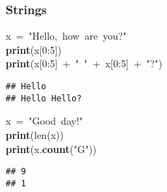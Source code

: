 \documentclass{beamer}\usepackage[]{graphicx}\usepackage[]{color}
\makeatletter
\newcommand{\hlnum}[1]{\textcolor[rgb]{0.686,0.059,0.569}{#1}}%
\newcommand{\hlstr}[1]{\textcolor[rgb]{0.192,0.494,0.8}{#1}}%
\newcommand{\hlopt}[1]{\textcolor[rgb]{0,0,0}{#1}}%
\newcommand{\hlstd}[1]{\textcolor[rgb]{0.345,0.345,0.345}{#1}}%
\newcommand{\hlkwa}[1]{\textcolor[rgb]{0.161,0.373,0.58}{\textbf{#1}}}%
\newcommand{\hlkwb}[1]{\textcolor[rgb]{0.69,0.353,0.396}{#1}}%
\newcommand{\hlkwd}[1]{\textcolor[rgb]{0.737,0.353,0.396}{\textbf{#1}}}%
\newenvironment{kframe}{%
 \def\at@end@of@kframe{}%
 \ifinner\ifhmode%
  \def\at@end@of@kframe{\end{minipage}}%
  \begin{minipage}{\columnwidth}%
 \fi\fi%
 \def\FrameCommand##1{\hskip\@totalleftmargin \hskip-\fboxsep
 \colorbox{shadecolor}{##1}\hskip-\fboxsep
     \hskip-\linewidth \hskip-\@totalleftmargin \hskip\columnwidth}%
 \MakeFramed {\advance\hsize-\width
   \@totalleftmargin\z@ \linewidth\hsize
   \@setminipage}}%
 {\par\unskip\endMakeFramed%
 \at@end@of@kframe}
\newenvironment{knitrout}{}{} %
\makeatother
\begin{document}
\begin{frame}[fragile]
\frametitle{Strings}
\begin{knitrout}
\color{fgcolor}\begin{kframe}
\noindent
\ttfamily
\hlstd{x\ }\hlopt{=\ }\hlstd{}\hlstr{"Hello,\ how\ are\ you?"}\hlstd{}\hspace*{\fill}\\
\hlkwa{print}\hlstd{}\hlopt{(}\hlstd{x}\hlopt{{[}}\hlstd{}\hlnum{0}\hlstd{}\hlopt{:}\hlstd{}\hlnum{5}\hlstd{}\hlopt{{]})}\hspace*{\fill}\\
\hlstd{}\hlkwa{print}\hlstd{}\hlopt{(}\hlstd{x}\hlopt{{[}}\hlstd{}\hlnum{0}\hlstd{}\hlopt{:}\hlstd{}\hlnum{5}\hlstd{}\hlopt{{]}\ +\ }\hlstd{}\hlstr{"\ "}\hlstd{\ }\hlopt{+\ }\hlstd{x}\hlopt{{[}}\hlstd{}\hlnum{0}\hlstd{}\hlopt{:}\hlstd{}\hlnum{5}\hlstd{}\hlopt{{]}\ +\ }\hlstd{}\hlstr{"?"}\hlstd{}\hlopt{)}\hlstd{}\hspace*{\fill}
\mbox{}
\normalfont

\begin{verbatim}
## Hello
## Hello Hello?
\end{verbatim}
\end{kframe}
\end{knitrout}

\begin{knitrout}
\color{fgcolor}\begin{kframe}
\noindent
\ttfamily
\hlstd{x\ }\hlopt{=\ }\hlstd{}\hlstr{"Good\ day!"}\hlstd{}\hspace*{\fill}\\
\hlkwa{print}\hlstd{}\hlopt{(}\hlstd{}\hlkwb{len}\hlstd{}\hlopt{(}\hlstd{x}\hlopt{))}\hspace*{\fill}\\
\hlstd{}\hlkwa{print}\hlstd{}\hlopt{(}\hlstd{x}\hlopt{.}\hlstd{}\hlkwd{count}\hlstd{}\hlopt{(}\hlstd{}\hlstr{"G"}\hlstd{}\hlopt{))}\hlstd{}\hspace*{\fill}
\mbox{}
\normalfont

\begin{verbatim}
## 9
## 1
\end{verbatim}
\end{kframe}
\end{knitrout}
\end{frame}
\end{document}
